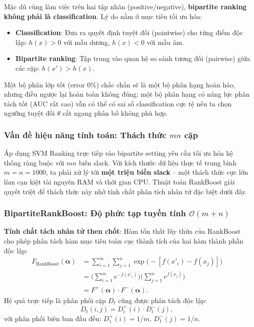 \begin{tcolorbox}[enhanced, breakable, colback=blue!5, colframe=blue!50!black,
                 title={Khác biệt bản chất với binary classification}]
Mặc dù cùng làm việc trên hai tập nhãn (positive/negative), \textbf{bipartite ranking không phải là classification}. 
Lý do nằm ở mục tiêu tối ưu hóa:
\begin{itemize}
    \item \textbf{Classification}: Đưa ra quyết định tuyệt đối (pointwise) cho từng điểm độc lập: $h(x) > 0$ với mẫu dương, $h(x) < 0$ với mẫu âm.
    \item \textbf{Bipartite ranking}: Tập trung vào quan hệ so sánh tương đối (pairwise) giữa các cặp: $h(x') > h(x)$.
\end{itemize}
Một bộ phân lớp tốt (error 0\%) chắc chắn sẽ là một bộ phân hạng hoàn hảo, nhưng điều ngược lại hoàn toàn không đúng: một bộ phân hạng có năng lực phân tách tốt (AUC rất cao) vẫn có thể có sai số classification cực tệ nếu ta chọn ngưỡng tuyệt đối $\theta$ cắt ngang phân bố không phù hợp.
\end{tcolorbox}

\subsubsection{Vấn đề hiệu năng tính toán: Thách thức $mn$ cặp}

Áp dụng SVM Ranking trực tiếp vào bipartite setting yêu cầu tối ưu hóa hệ thống ràng buộc với $mn$ biến slack. Với kích thước dữ liệu thực tế trung bình $m = n = 1000$, ta phải xử lý tới \textbf{một triệu biến slack} -- một thách thức cực lớn làm cạn kiệt tài nguyên RAM và thời gian CPU. Thuật toán RankBoost giải quyết triệt để thách thức này nhờ tính chất phân tích nhân tử đặc biệt dưới đây.

\subsubsection{BipartiteRankBoost: Độ phức tạp tuyến tính $\mathcal{O}(m+n)$}

\textbf{Tính chất tách nhân tử then chốt}: Hàm tổn thất lũy thừa của RankBoost cho phép phân tách hàm mục tiêu toàn cục thành tích của hai hàm thành phần độc lập:
\begin{align}
    F_{\text{RankBoost}}(\bm{\alpha})
    &= \sum_{i=1}^m \sum_{j=1}^n \exp\bigl(-[f(x'_i) - f(x_j)]\bigr) \nonumber \\
    &= \biggl(\sum_{i=1}^m e^{-f(x'_i)}\biggr) \biggl(\sum_{j=1}^n e^{f(x_j)}\biggr) \nonumber \\
    &= F^+(\bm{\alpha}) \cdot F^-(\bm{\alpha}).
    \label{eq:F_factor}
\end{align}
Hệ quả trực tiếp là phân phối cặp $D_t$ cũng được phân tách độc lập:
\[
    D_t(i, j) = D^+_t(i) \cdot D^-_t(j),
\]
với phân phối biên ban đầu đều: $D^+_1(i) = 1/m$, $D^-_1(j) = 1/n$.

